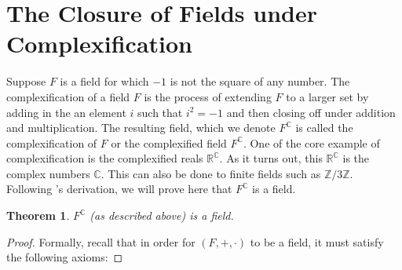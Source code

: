 \documentclass[12pt]{article}
\newcommand{\Z}{\mathbb{Z}}
\newcommand{\R}{\mathbb{R}}
\newcommand{\C}{\mathbb{C}}
\newcommand{\fc}{F^{\C}}
\theoremstyle{plain}
\newtheorem{theorem}{Theorem}[section]
\theoremstyle{definition}
\begin{document}
\begin{appendices}
\begin{center}
\end{center}


\newpage 
\section{The Closure of Fields under Complexification} \label{appendixB}

	Suppose $F$ is a field for which $-1$ is not the square of any number. The complexification of a field $F$ is the process of extending $F$ to a larger set by adding in the an element $i$ such that $i^2 = -1$ and then closing off under addition and multiplication. The resulting field, which we denote $F^\C$ is called the complexification of $F$ or the complexified field $F^\C$. One of the core example of complexification is the complexified reals $\R^\C$. As it turns out, this $\R^\C$ is the complex numbers $\C$. This can also be done to finite fields such as $\Z/3\Z$. Following \cite{complexification}'s derivation, we will prove here that $F^\C$ is a field.

\begin{theorem} 
$\fc$ (as described above) is a field.
\end{theorem}

\begin{proof} Formally, recall that in order for $(F,+,\cdot)$ to be a field, it must satisfy the following axioms:


\end{proof}
\end{appendices}
\end{document}
